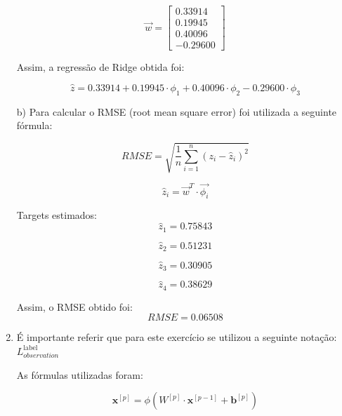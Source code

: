 \documentclass[a4paper,12pt]{article} %
\begin{document}
\begin{enumerate}
\begin{equation*}
    \vec{w} = \begin{bmatrix}  0.33914 \\ 0.19945 \\ 0.40096 \\ -0.29600 \end{bmatrix}
\end{equation*}

Assim, a regressão de Ridge obtida foi:

\begin{equation*}  
    \hat{z} = 0.33914 + 0.19945 \cdot \phi_1 + 0.40096 \cdot \phi_2 - 0.29600 \cdot \phi_3
\end{equation*}

b)
Para calcular o RMSE (root mean square error) foi utilizada a seguinte fórmula:

\begin{equation}
    RMSE = \sqrt{\frac{1}{n} \sum_{i=1}^{n} (z_i - \hat{z}_i)^2}
\end{equation}

\begin{equation}
    \hat{z}_i = \vec{w}^T \cdot \vec{\phi_i}
\end{equation}
 
Targets estimados:
\begin{equation*}
    \hat{z}_1 = 0.75843
\end{equation*}

\begin{equation*}
    \hat{z}_2 = 0.51231
\end{equation*}

\begin{equation*}
    \hat{z}_3 = 0.30905
\end{equation*}

\begin{equation*}
    \hat{z}_4 = 0.38629
\end{equation*}

Assim, o RMSE obtido foi:
\begin{equation*}
    RMSE = 0.06508
\end{equation*}

\item
É importante referir que para este exercício se utilizou a seguinte notação: $L^{\text{label}}_{observation}$

As fórmulas utilizadas foram:

\begin{equation}
    \textbf{x}^{[p]} = \phi({W}^{[p]} \cdot \textbf{x}^{[p-1]} + \textbf{b}^{[p]})
\end{equation}


\end{enumerate}
\end{document}
